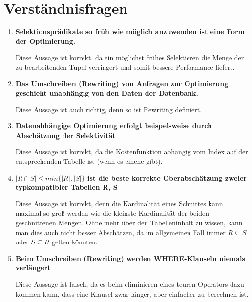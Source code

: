 \documentclass{scrartcl}
\begin{document}
\maketitle

\section{Verständnisfragen}
\begin{enumerate}
    \item \textbf{Selektionsprädikate so früh wie möglich anzuwenden ist eine Form der Optimierung.}

    Diese Aussage ist korrekt, da ein möglichst frühes Selektieren die Menge der zu bearbeitenden Tupel verringert und somit bessere Performance liefert.
    \item \textbf{Das Umschreiben (Rewriting) von Anfragen zur Optimierung geschieht unabhängig von den Daten der Datenbank.}

    Diese Aussage ist auch richtig, denn so ist Rewriting definiert.
    \item \textbf{Datenabhängige Optimierung erfolgt beispelsweise durch Abschätzung der Selektivität}

    Diese Aussage ist korrekt, da die Kostenfunktion abhängig vom Index auf der entsprechenden Tabelle ist (wenn es einene gibt).
    \item \textbf{$| R \cap S |\leq min\{| R |, | S |\}$ ist die beste korrekte Oberabschätzung zweier typkompatibler Tabellen R, S}
    
    Diese Aussage ist korrekt, denn die Kardinalität eines Schnittes kann maximal so groß werden wie die kleinste Kardinalität der beiden geschnittenen Mengen. Ohne mehr über den Tabelleninhalt zu wissen, kann man dies auch nicht besser Abschätzen, da im allgemeinen Fall immer $R\subseteq S$ oder $S\subseteq R$ gelten könnten.
    \item \textbf{Beim Umschreiben (Rewriting) werden WHERE-Klauseln niemals verlängert}
    
    Diese Aussage ist falsch, da es beim eliminieren eines teuren Operators dazu kommen kann, dass eine Klausel zwar länger, aber einfacher zu berechnen ist.
\end{enumerate}
\end{document}
